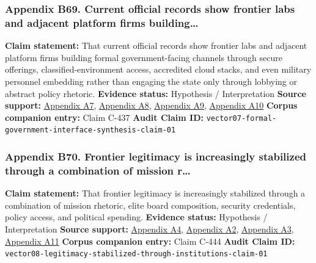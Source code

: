 \documentclass[
  american,
  11pt,
  letterpaper,
]{article}
\begin{document}
\subsubsection{Appendix B69. Current official records show frontier labs
and adjacent platform firms
building\ldots{}}\label{ch-08-appendix-b69-current-official-records-show-frontier-labs-and-adjacent-platform-firms-building}

\textbf{Claim statement:} That current official records show frontier
labs and adjacent platform firms building formal government-facing
channels through secure offerings, classified-environment access,
accredited cloud stacks, and even military personnel embedding rather
than engaging the state only through lobbying or abstract policy
rhetoric. \textbf{Evidence status:} Hypothesis / Interpretation
\textbf{Source support:}
\hyperref[ch-08-appendix-a7-introducing-openai-for-government]{Appendix
A7},
\hyperref[ch-08-appendix-a8-claude-gov-models-for-u-s-national-security-customers]{Appendix
A8},
\hyperref[ch-08-appendix-a9-anthropic-and-palantir-partner-to-bring-claude-ai-models-to-aws-for-u-s-government-intelligence-and-defense-operations]{Appendix
A9},
\hyperref[ch-08-appendix-a10-army-launches-detachment-201-executive-innovation-corps-to-drive-tech-transformation]{Appendix
A10} \textbf{Corpus companion entry:} Claim C-437 \textbf{Audit Claim
ID:} \texttt{vector07-formal-government-interface-synthesis-claim-01}

\subsubsection{Appendix B70. Frontier legitimacy is increasingly
stabilized through a combination of mission
r\ldots{}}\label{ch-08-appendix-b70-frontier-legitimacy-is-increasingly-stabilized-through-a-combination-of-mission-r}

\textbf{Claim statement:} That frontier legitimacy is increasingly
stabilized through a combination of mission rhetoric, elite board
composition, security credentials, policy access, and political
spending. \textbf{Evidence status:} Hypothesis / Interpretation
\textbf{Source support:}
\hyperref[ch-08-appendix-a4-openai-announces-new-members-to-board-of-directors]{Appendix
A4},
\hyperref[ch-08-appendix-a2-openai-appoints-former-top-us-cyberwarrior-paul-nakasone-to-its-board-of-directors]{Appendix
A2},
\hyperref[ch-08-appendix-a3-anthropic-outspends-openai-in-biggest-ever-lobbying-quarter]{Appendix
A3},
\hyperref[ch-08-appendix-a11-leading-the-future-committee-overview]{Appendix
A11} \textbf{Corpus companion entry:} Claim C-444 \textbf{Audit Claim
ID:}
\texttt{vector08-legitimacy-stabilized-through-institutions-claim-01}
\end{document}
